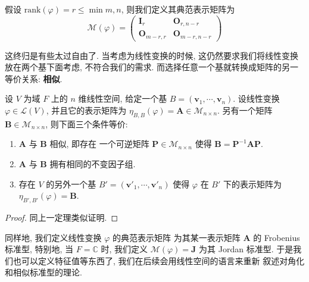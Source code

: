 \documentclass[UTF8]{book}
\begin{document}
假设 $\mathrm{rank}(\varphi)=r\leq \min{m,n}$, 
则我们定义其典范表示矩阵为 
$$ \mathcal{M}(\varphi) = \begin{pmatrix}
    \boldsymbol{I}_r & \boldsymbol{O}_{r,n-r} \\
    \boldsymbol{O}_{m-r,r} & \boldsymbol{O}_{m-r,n-r}
\end{pmatrix} $$

这终归是有些太过自由了. 当考虑为线性变换的时候, 
这仍然要求我们将线性变换放在两个基下面考虑, 不符合我们的需求. 
而选择任意一个基就转换成矩阵的另一等价关系: \textbf{相似}. 

\begin{theorem}
    设 $V$ 为域 $F$ 上的 $n$ 维线性空间, 
    给定一个基 $B=(\boldsymbol{v}_1,\cdots,\boldsymbol{v}_n)$. 
    设线性变换 $\varphi \in \mathcal{L}(V)$, 并且它的表示矩阵为 
    $\eta_{B,B}(\varphi) =\boldsymbol{A} \in 
    \mathcal{M}_{n\times n}$. 
    另有一个矩阵 $\boldsymbol{B} \in \mathcal{M}_{n\times n} $, 
    则下面三个条件等价: 
    \begin{enumerate}[(1)]
        \item $\boldsymbol{A}$ 与 $\boldsymbol{B}$ 相似, 即存在
        一个可逆矩阵 $\boldsymbol{P}\in \mathcal{M}_{n\times n}$ 
        使得 $\boldsymbol{B} = \boldsymbol{P}^{-1}\boldsymbol{A}
        \boldsymbol{P}$. 
        \item $\boldsymbol{A}$ 与 $\boldsymbol{B}$ 
        拥有相同的不变因子组. 
        \item 存在 $V$ 的另外一个基 
        $B'=(\boldsymbol{v}'_1,\cdots,\boldsymbol{v}'_n)$ 
        使得 $\varphi$ 在 $B'$ 下的表示矩阵为 
        $\eta_{B',B'}(\varphi) = \boldsymbol{B}$. 
    \end{enumerate}
\end{theorem}

\begin{proof}
    同上一定理类似证明. 
\end{proof}

同样地, 我们定义线性变换 $\varphi$ 的典范表示矩阵
为其某一表示矩阵 $\boldsymbol{A}$ 的 Frobenius 标准型, 
特别地, 当 $F = \mathbb{C}$ 时, 我们定义 
$\mathcal{M}(\varphi) = \boldsymbol{J}$ 为其 Jordan 标准型. 
于是我们也可以定义特征值等东西了, 我们在后续会用线性空间的语言来重新
叙述对角化和相似标准型的理论. 
\end{document}
